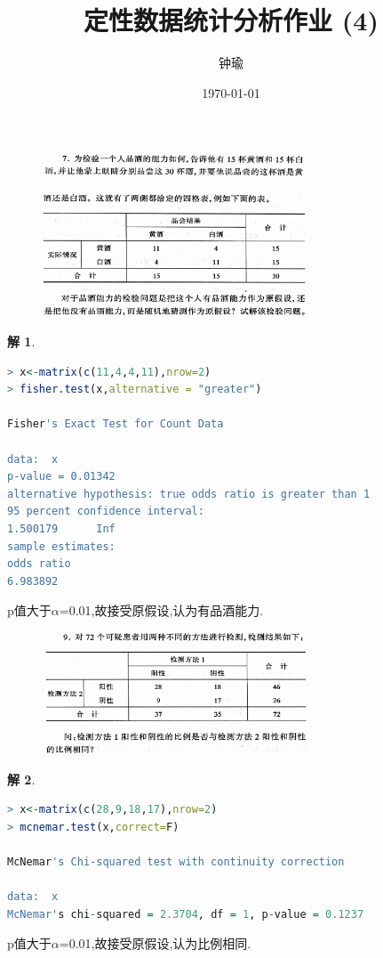 \documentclass[11pt,a4paper]{ctexart}
\title{定性数据统计分析作业 (4)}
\author{钟瑜 \quad 222018314210044}
\date{\today}
\newtheorem*{solution}{解}
\begin{document}
\maketitle
\pagestyle{plain}%
\begin{figure}[H]
	\includegraphics[width=0.7\textwidth]{screenshot001}
\end{figure}
\begin{figure}[H]
	\includegraphics[width=0.7\textwidth]{screenshot002}
\end{figure}

\begin{solution}
\end{solution}

\begin{lstlisting}[language=r]
> x<-matrix(c(11,4,4,11),nrow=2) 
> fisher.test(x,alternative = "greater")

Fisher's Exact Test for Count Data

data:  x
p-value = 0.01342
alternative hypothesis: true odds ratio is greater than 1
95 percent confidence interval:
1.500179      Inf
sample estimates:
odds ratio 
6.983892 
\end{lstlisting}
p值大于$ \alpha $=0.01,故接受原假设,认为有品酒能力.\\

\begin{figure}[H]
	\includegraphics[width=0.7\textwidth]{screenshot003}
\end{figure}
\begin{solution}
\end{solution}
\begin{lstlisting}[language=r]
> x<-matrix(c(28,9,18,17),nrow=2) 
> mcnemar.test(x,correct=F)

McNemar's Chi-squared test with continuity correction

data:  x
McNemar's chi-squared = 2.3704, df = 1, p-value = 0.1237
\end{lstlisting}
p值大于$ \alpha $=0.01,故接受原假设,认为比例相同.\\
\end{document}
